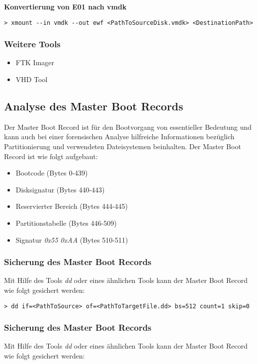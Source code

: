 \textbf{Konvertierung von E01 nach vmdk}\\
\begin{lstlisting}
> xmount --in vmdk --out ewf <PathToSourceDisk.vmdk> <DestinationPath>
\end{lstlisting}


\subsubsection{Weitere Tools}
\begin{itemize}
\item FTK Imager
\item VHD Tool
\end{itemize}



\subsection{Analyse des Master Boot Records}
Der Master Boot Record ist für den Bootvorgang von essentieller Bedeutung und kann auch bei einer forensischen Analyse hilfreiche Informationen bezüglich Partitionierung und verwendeten Dateisystemen beinhalten. Der Master Boot Record ist wie folgt aufgebaut:

\begin{itemize}
\item Bootcode (Bytes 0-439)
\item Disksignatur (Bytes 440-443)
\item Reservierter Bereich (Bytes 444-445)
\item Partitionstabelle (Bytes 446-509)
\item Signatur \textit{0x55 0xAA} (Bytes 510-511)
\end{itemize}

\subsubsection{Sicherung des Master Boot Records}
Mit Hilfe des Tools \textit{dd} oder eines ähnlichen Tools kann der Master Boot Record wie folgt gesichert werden:

\begin{lstlisting}
> dd if=<PathToSource> of=<PathToTargetFile.dd> bs=512 count=1 skip=0
\end{lstlisting}


\subsubsection{Sicherung des Master Boot Records}
Mit Hilfe des Tools \textit{dd} oder eines ähnlichen Tools kann der Master Boot Record wie folgt gesichert werden:


